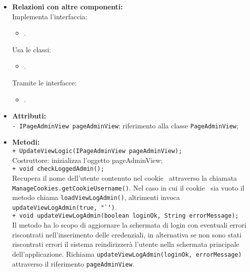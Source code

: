 {{\begin{sloppypar}
{{\begin{itemize}
				\item[] \textbf{Relazioni con altre componenti:} \\
					Implementa l'interfaccia:
					\begin{itemize}
						\item[] .
					\end{itemize}
					Usa le classi:
					\begin{itemize}
						\item[] .
					\end{itemize}
					Tramite le interfacce:
					\begin{itemize}
						\item[] .\\
					\end{itemize}
					
				\item[] \textbf{Attributi:}\\
					\texttt{- IPageAdminView pageAdminView}: riferimento alla classe \texttt{PageAdminView};\\

				\item[] \textbf{Metodi:}\\
					\texttt{+ UpdateViewLogic(IPageAdminView pageAdminView);}\\
					Costruttore: inizializza l'oggetto pageAdminView;\\
					
					\texttt{+ void checkLoggedAdmin();}\\
					Recupera il nome dell’utente contenuto nel cookie\g~ attraverso la chiamata \texttt{ManageCookies.getCookieUsername()}. Nel caso in cui il cookie\g~ sia vuoto il metodo chiama \texttt{loadViewLogAdmin()}, altrimenti invoca \texttt{updateViewLogAdmin(true, "``)}.\\
					
					\texttt{+ void updateViewLogAdmin(boolean loginOk, String errorMessage);}\\
					Il metodo ha lo scopo di aggiornare la schermata di login con eventuali errori riscontrati nell'inserimento delle credenziali, in alternativa se non sono stati riscontrati errori il sistema reindirizzerà l'utente nella schermata principale dell'applicazione. Richiama \texttt{updateViewLogAdmin(loginOk, errorMessage)} attraverso il riferimento \texttt{pageAdminView}.\\
					

\end{itemize}}}
\end{sloppypar}}}
